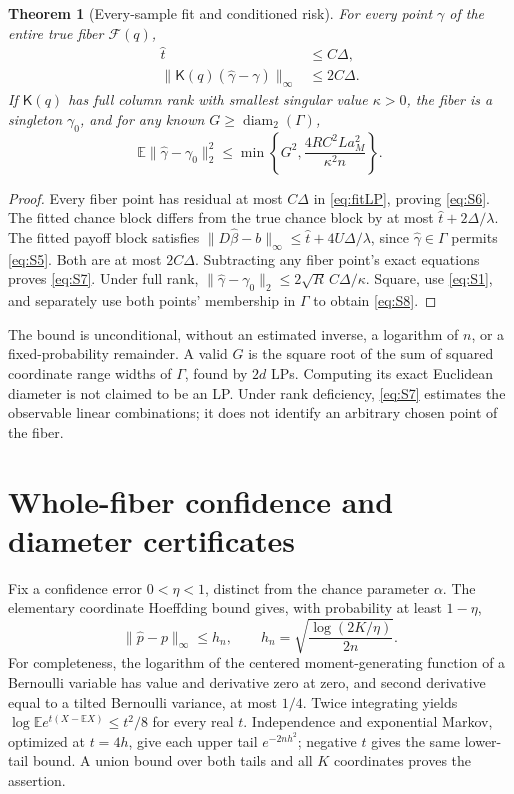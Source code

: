 \documentclass[11pt,a4paper]{article}
\numberwithin{equation}{section}
\newtheorem{theorem}{Theorem}
\theoremstyle{definition}
\newcommand{\E}{\mathbb E}
\DeclareMathOperator{\diam}{diam}
\begin{document}
\begin{theorem}[Every-sample fit and conditioned risk]\label{thm:risk}
For every point \(\gamma\) of the entire true fiber \(\mathcal F(q)\),
\begin{align}
 \widehat t&\le C\Delta, \label{eq:S6}\\
 \|\mathsf K(q)(\widehat\gamma-\gamma)\|_\infty
       &\le2C\Delta. \label{eq:S7}
\end{align}
If \(\mathsf K(q)\) has full column rank with smallest singular
value \(\kappa>0\), the fiber is a singleton \(\gamma_0\), and
for any known \(G\ge\diam_2(\Gamma)\),
\begin{equation}\label{eq:S8}
 \E\|\widehat\gamma-\gamma_0\|_2^2
 \le\min\left\{G^2,\frac{4RC^2La_M^2}{\kappa^2n}\right\}.
\end{equation}
\end{theorem}
\begin{proof}
Every fiber point has residual at most \(C\Delta\) in
\eqref{eq:fitLP}, proving \eqref{eq:S6}.
The fitted chance block differs from the true chance block by at
most \(\widehat t+2\Delta/\lambda\).
The fitted payoff block satisfies
\(\|D\widehat\beta-b\|_\infty
 \le\widehat t+4U\Delta/\lambda\), since
\(\widehat\gamma\in\Gamma\) permits \eqref{eq:S5}.
Both are at most \(2C\Delta\). Subtracting any fiber point's exact
equations proves \eqref{eq:S7}.
Under full rank,
\(\|\widehat\gamma-\gamma_0\|_2\le2\sqrt R\,C\Delta/\kappa\).
Square, use \eqref{eq:S1}, and separately use both points'
membership in \(\Gamma\) to obtain \eqref{eq:S8}.
\end{proof}

The bound is unconditional, without an estimated inverse,
a logarithm of \(n\), or a fixed-probability remainder.
A valid \(G\) is the square root of the sum of squared coordinate
range widths of \(\Gamma\), found by \(2d\) LPs.
Computing its exact Euclidean diameter is not claimed to be an LP.
Under rank deficiency, \eqref{eq:S7} estimates the observable linear
combinations; it does not identify an arbitrary chosen point of the fiber.

\section{Whole-fiber confidence and diameter certificates}
\label{sec:confidence}
Fix a confidence error \(0<\eta<1\), distinct from the chance parameter
\(\alpha\). The elementary coordinate Hoeffding bound gives, with
probability at least \(1-\eta\),
\[
 \|\widehat p-p\|_\infty\le h_n,\qquad
 h_n=\sqrt{\frac{\log(2K/\eta)}{2n}}.
\]
For completeness, the logarithm of the centered moment-generating
function of a Bernoulli variable has value and derivative zero at
zero, and second derivative equal to a tilted Bernoulli variance,
at most \(1/4\). Twice integrating yields
\(\log\E e^{t(X-\E X)}\le t^2/8\) for every real \(t\).
Independence and exponential Markov, optimized at \(t=4h\),
give each upper tail \(e^{-2nh^2}\); negative \(t\) gives the
same lower-tail bound. A union bound over both tails and all \(K\)
coordinates proves the assertion.
\end{document}
